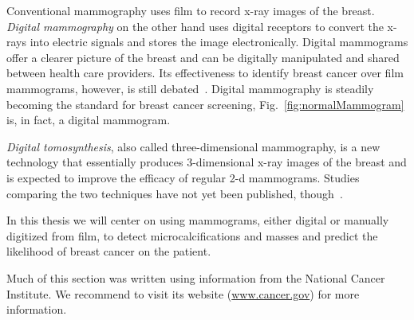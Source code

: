 Conventional mammography uses film to record x-ray images of the breast. \emph{Digital mammography} on the other hand uses digital receptors to convert the x-rays into electric signals and stores the image electronically. Digital mammograms offer a clearer picture of the breast and can be digitally manipulated and shared between health care providers. Its effectiveness to identify breast cancer over film mammograms, however, is still debated~\cite{Kerlikowske2011, Pisano2008, Skaane2007}. Digital mammography is steadily becoming the standard for breast cancer screening, Fig.~\ref{fig:normalMammogram} is, in fact, a digital mammogram.

\emph{Digital tomosynthesis}, also called three-dimensional mammography, is a new technology that essentially produces 3-dimensional x-ray images of the breast and is expected to improve the efficacy of regular 2-d mammograms. Studies comparing the two techniques have not yet been published, though~\cite{Mammograms2014}.

In this thesis we will center on using mammograms, either digital or manually digitized from film, to detect microcalcifications and masses and predict the likelihood of breast cancer on the patient.

Much of this section was written using information from the National Cancer Institute. We recommend to visit its website (\url{www.cancer.gov}) for more information.
